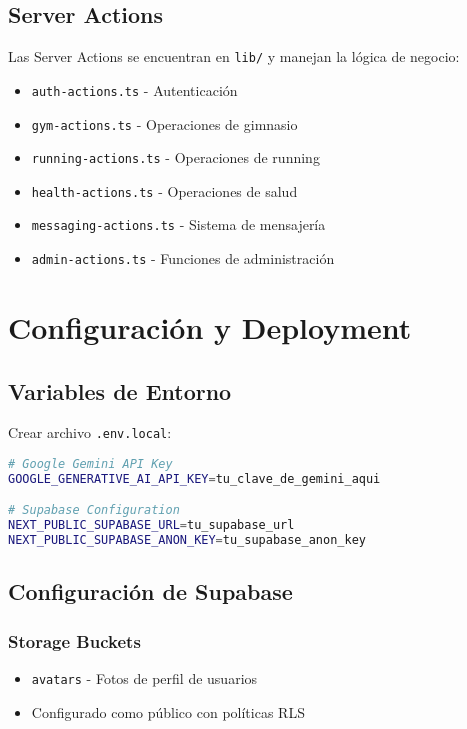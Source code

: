 \documentclass[12pt,a4paper]{article}
\begin{document}
\subsection{Server Actions}

Las Server Actions se encuentran en \texttt{lib/} y manejan la lógica de negocio:

\begin{itemize}
    \item \texttt{auth-actions.ts} - Autenticación
    \item \texttt{gym-actions.ts} - Operaciones de gimnasio
    \item \texttt{running-actions.ts} - Operaciones de running
    \item \texttt{health-actions.ts} - Operaciones de salud
    \item \texttt{messaging-actions.ts} - Sistema de mensajería
    \item \texttt{admin-actions.ts} - Funciones de administración
\end{itemize}

\section{Configuración y Deployment}

\subsection{Variables de Entorno}

Crear archivo \texttt{.env.local}:

\begin{lstlisting}[language=bash, caption=Variables de entorno requeridas]
# Google Gemini API Key
GOOGLE_GENERATIVE_AI_API_KEY=tu_clave_de_gemini_aqui

# Supabase Configuration
NEXT_PUBLIC_SUPABASE_URL=tu_supabase_url
NEXT_PUBLIC_SUPABASE_ANON_KEY=tu_supabase_anon_key
\end{lstlisting}

\subsection{Configuración de Supabase}

\subsubsection{Storage Buckets}
\begin{itemize}
    \item \texttt{avatars} - Fotos de perfil de usuarios
    \item Configurado como público con políticas RLS
\end{itemize}
\end{document}
